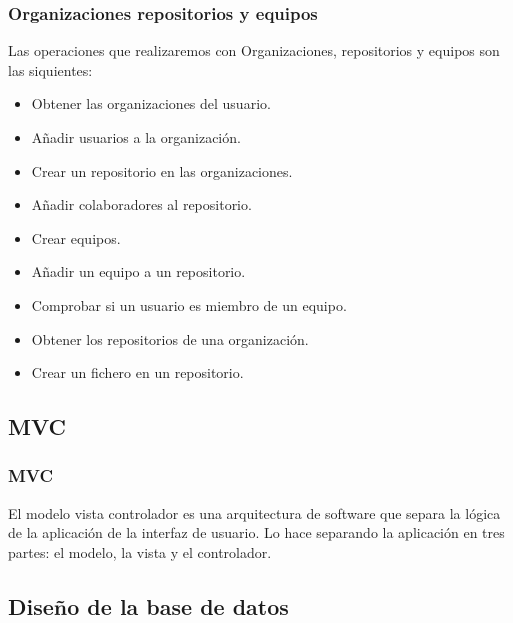 \documentclass{beamer}
\begin{document}
\begin{frame}
\frametitle{Organizaciones repositorios y equipos}

  Las operaciones que realizaremos con Organizaciones, repositorios y equipos son las siquientes:

  \begin{itemize}
    \item Obtener las organizaciones del usuario.
    \item Añadir usuarios a la organización.
    \item Crear un repositorio en las organizaciones.
    \item Añadir colaboradores al repositorio.
    \item Crear equipos.
    \item Añadir un equipo a un repositorio.
    \item Comprobar si un usuario es miembro de un equipo.
    \item Obtener los repositorios de una organización.
    \item Crear un fichero en un repositorio.
  \end{itemize}

\end{frame}

  
\subsection{MVC}

\begin{frame}
\frametitle{MVC}

  El modelo vista controlador es una arquitectura de software que separa la lógica de
  la aplicación de la interfaz de usuario. Lo hace separando la aplicación en tres partes: 
  el modelo, la vista y el controlador.

\end{frame}


\subsection{Diseño de la base de datos}
\end{document}

